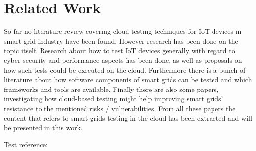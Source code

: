 \section{Related Work}
So far no literature review covering cloud testing techniques for IoT devices in smart grid industry have been found. However research has been done on the topic itself. Research about how to test IoT devices generally with regard to cyber security and performance aspects has been done, as well as proposals on how such tests could be executed on the cloud. Furthermore there is a bunch of literature about how software components of smart grids can be tested and which frameworks and tools are available. Finally there are also some papers, investigating how cloud-based testing might help improving smart grids' resistance to the mentioned risks / vulnerabilities. From all these papers the content that refers to smart grids testing in the cloud has been extracted and will be presented in this work.

Test reference: \cite{bertolino2019systematic}
